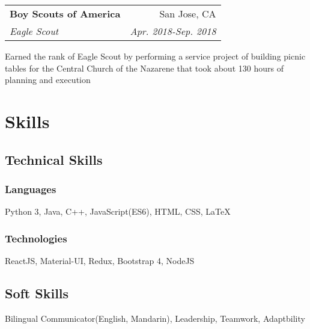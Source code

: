 \documentclass[letterpaper,8pt]{article}
\makeatletter
\newcommand{\resumeSubheading}[4]{
  \vspace{0.25em}
  \begin{tabular*}{0.97\textwidth}[t]{l@{\extracolsep{\fill}}r}
    \textbf{#1} & #2 \\
    \textit{#3} & \textit{#4} \\
  \end{tabular*}\vspace{0.25em}
}
\makeatother
\begin{document}
\resumeSubheading{Boy Scouts of America}
{San Jose, CA}{Eagle Scout}{Apr. 2018-Sep. 2018}

Earned the rank of Eagle Scout by performing a service project of building picnic tables for the Central Church of the Nazarene that took about 130 hours of planning and execution

\section{Skills}

\begin{multicols}{2}
\subsection{Technical Skills}

\subsubsection{Languages}

\begin{adjustwidth}{4em}{}
Python 3, Java, C++, JavaScript(ES6), HTML, CSS, {\LaTeX}
\end{adjustwidth}

\subsubsection{Technologies}

\begin{adjustwidth}{4em}{}
ReactJS, Material-UI, Redux, Bootstrap 4, NodeJS
\end{adjustwidth}

\columnbreak

\subsection{Soft Skills}

\begin{adjustwidth}{2em}{}
Bilingual Communicator(English, Mandarin), Leadership, Teamwork, Adaptbility
\end{adjustwidth}

\end{multicols}
\end{document}
